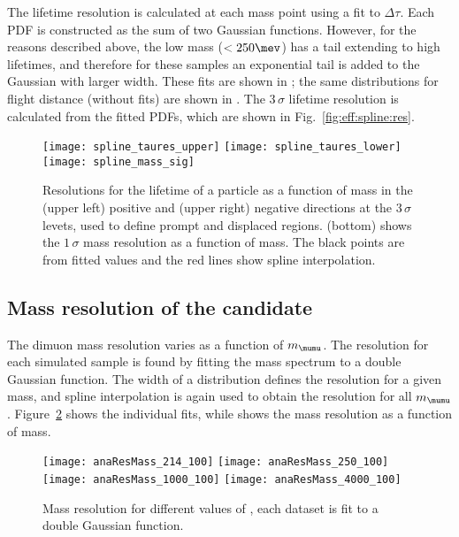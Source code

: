 The lifetime resolution is calculated at each mass point using a fit to $\Delta\tau$.
Each PDF is constructed as the sum of two Gaussian functions.
However, for the reasons described above, the low mass ($<250\mev$) has a tail extending to high
lifetimes, and therefore for these samples an exponential tail is added to the Gaussian with larger
width.
These fits are shown in ; the same distributions for flight distance (without
fits) are shown in .
The $3\,\sigma$ lifetime resolution is calculated from the fitted PDFs, which are
shown in Fig.~\ref{fig:eff:spline:res}.

\begin{figure}
  \begin{center}
    \texttt{[image: spline\_taures\_upper]}
    \texttt{[image: spline\_taures\_lower]}\\
    \texttt{[image: spline\_mass\_sig]}
    \caption{
      Resolutions for the lifetime of a particle as a function of mass in the
      (upper left) positive and
      (upper right) negative directions at the $3\,\sigma$ levets, used to
      define prompt and displaced regions.
      (bottom) shows the $1\,\sigma$ mass resolution as a function of
      mass.
      The black points are from fitted values and the red lines show spline interpolation.
    }
    \label{fig:eff:res}
  \end{center}
\end{figure}




\subsection{Mass resolution of the \db candidate}
The dimuon mass resolution varies as a function of $m_\mumu$.
The resolution for each simulated sample is found by fitting the mass spectrum to a
double Gaussian function.
The width of a distribution defines the resolution for a given mass, and spline interpolation is
again used to obtain the resolution for all $m_\mumu$.
Figure~\ref{fig:massres} shows the individual fits, while  shows
the mass resolution as a function of mass.


\begin{figure}
  \begin{center}
    \texttt{[image: anaResMass\_214\_100]}
    \texttt{[image: anaResMass\_250\_100]}
    \texttt{[image: anaResMass\_1000\_100]}
    \texttt{[image: anaResMass\_4000\_100]}
  \end{center}
  \caption{
    Mass resolution for different values of \mdb, each dataset is fit to a double Gaussian
    function.
  }
  \label{fig:massres}
\end{figure}


